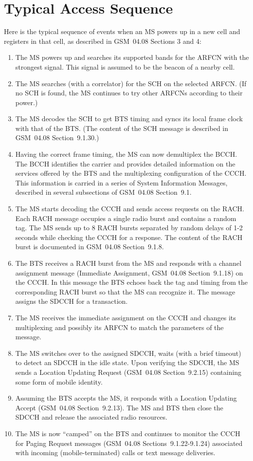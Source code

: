 \documentclass[11pt]{book}
\begin{document}
\section{Typical Access Sequence}
Here is the typical sequence of events when an MS powers up in a new cell and registers in that cell, as described in GSM~04.08 Sections 3 and 4:
\begin{enumerate}
	\item The MS powers up and searches its supported bands for the ARFCN with the strongest signal. This signal is assumed to be the beacon of a nearby cell.
	\item The MS searches (with a correlator) for the SCH on the selected ARFCN. (If no SCH is found, the MS continues to try other ARFCNs according to their power.)
	\item The MS decodes the SCH to get BTS timing and syncs its local frame clock with that of the BTS. (The content of the SCH message is described in GSM~04.08 Section~9.1.30.)
	\item Having the correct frame timing, the MS can now demultiplex the BCCH. The BCCH identifies the carrier and provides detailed information on the services offered by the BTS and the multiplexing configuration of the CCCH. This information is carried in a series of System Information Messages, described in several subsections of GSM~04.08 Section~9.1.
	\item The MS starts decoding the CCCH and sends access requests on the RACH. Each RACH message occupies a single radio burst and contains a random tag. The MS sends up to 8 RACH bursts separated by random delays of 1-2 seconds while checking the CCCH for a response. The content of the RACH burst is documented in GSM~04.08 Section~9.1.8.
	\item The BTS receives a RACH burst from the MS and responds with a channel assignment message (Immediate Assignment, GSM~04.08 Section~9.1.18) on the CCCH. In this message the BTS echoes back the tag and timing from the corresponding RACH burst so that the MS can recognize it. The message assigns the SDCCH for a transaction.
	\item The MS receives the immediate assignment on the CCCH and changes its multiplexing and possibly its ARFCN to match the parameters of the message.
	\item The MS switches over to the assigned SDCCH, waits (with a brief timeout) to detect an SDCCH in the idle state.  Upon verifying the SDCCH, the MS sends a Location Updating Request (GSM~04.08 Section~9.2.15) containing some form of mobile identity.
	\item Assuming the BTS accepts the MS, it responds with a Location Updating Accept (GSM~04.08 Section~9.2.13). The MS and BTS then close the SDCCH and release the associated radio resources.
	\item The MS is now ``camped'' on the BTS and continues to monitor the CCCH for Paging Request messages (GSM~04.08 Sections~9.1.22-9.1.24) associated with incoming (mobile-terminated) calls or text message deliveries.
\end{enumerate}
\end{document}
